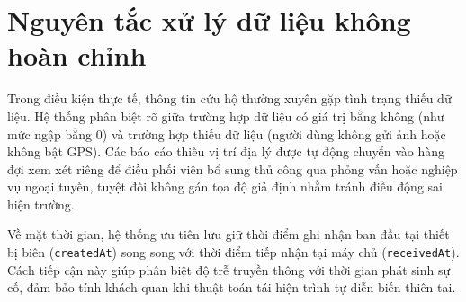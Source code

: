 \section{Nguyên tắc xử lý dữ liệu không hoàn chỉnh}\label{sec:incomplete-data}
Trong điều kiện thực tế, thông tin cứu hộ thường xuyên gặp tình trạng thiếu dữ liệu. Hệ thống phân biệt rõ giữa trường hợp dữ liệu có giá trị bằng không (như mức ngập bằng 0) và trường hợp thiếu dữ liệu (người dùng không gửi ảnh hoặc không bật GPS). Các báo cáo thiếu vị trí địa lý được tự động chuyển vào hàng đợi xem xét riêng để điều phối viên bổ sung thủ công qua phỏng vấn hoặc nghiệp vụ ngoại tuyến, tuyệt đối không gán tọa độ giả định nhằm tránh điều động sai hiện trường.

Về mặt thời gian, hệ thống ưu tiên lưu giữ thời điểm ghi nhận ban đầu tại thiết bị biên (\texttt{createdAt}) song song với thời điểm tiếp nhận tại máy chủ (\texttt{receivedAt}). Cách tiếp cận này giúp phân biệt độ trễ truyền thông với thời gian phát sinh sự cố, đảm bảo tính khách quan khi thuật toán tái hiện trình tự diễn biến thiên tai.
